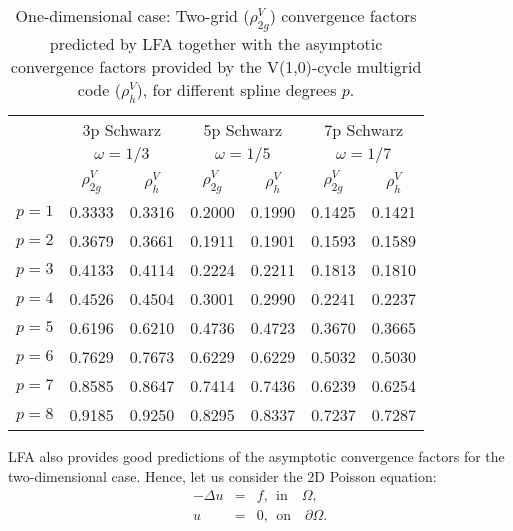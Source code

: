 \documentclass{article}
\begin{document}
\begin{table}[htb]
	\begin{center}
		\begin{tabular}{ccccccc}
			\cline{2-7}
			& \multicolumn{2}{c}{3p Schwarz} & \multicolumn{2}{c}{5p Schwarz} & \multicolumn{2}{c}{7p Schwarz}\\
			& \multicolumn{2}{c}{$\omega = 1/3$} & \multicolumn{2}{c}{$\omega = 1/5$} & \multicolumn{2}{c}{$\omega = 1/7$}\\
			\cline{2-7}
			& $\rho^V_{2g}$ & $\rho^V_h$ & $\rho^V_{2g}$ & $\rho^V_h$ & $\rho^V_{2g}$ & $\rho^V_h$ \\
			\hline
			$p = 1$ & 0.3333  & 0.3316  & 0.2000  & 0.1990  & 0.1425  &  0.1421  \\
			$p = 2$ & 0.3679  & 0.3661  & 0.1911  & 0.1901  & 0.1593  &  0.1589  \\
			$p = 3$ & 0.4133  & 0.4114  & 0.2224  & 0.2211  & 0.1813  &  0.1810  \\
			$p = 4$ & 0.4526  & 0.4504  & 0.3001  & 0.2990  & 0.2241  &  0.2237  \\
			$p = 5$ & 0.6196  & 0.6210  & 0.4736  & 0.4723  & 0.3670  &  0.3665  \\
			$p = 6$ & 0.7629  & 0.7673  & 0.6229  & 0.6229  & 0.5032  &  0.5030  \\
			$p = 7$ & 0.8585  & 0.8647  & 0.7414  & 0.7436  & 0.6239  &  0.6254  \\
			$p = 8$ & 0.9185  & 0.9250  & 0.8295  & 0.8337  & 0.7237  &  0.7287  \\
			\hline
		\end{tabular}
	\caption{One-dimensional case: Two-grid ($\rho^V_{2g}$) convergence factors predicted by LFA together with the asymptotic convergence factors provided by the V(1,0)-cycle multigrid code ($\rho^V_h$), for different spline degrees $p$.}
	\label{table_LFA_Schwarz_1D}
	\end{center}
\end{table}

LFA also provides good predictions of the asymptotic convergence factors for the two-dimensional case. Hence, let us consider the 2D Poisson equation:
\begin{equation}
\begin{array}{ccc}
-\Delta u  &=& f, \ \  \mbox{in} \quad \Omega, \\ 
u &=& 0, \ \  \mbox{on} \quad \partial \Omega.
\end{array}
\end{equation}
\end{document}

